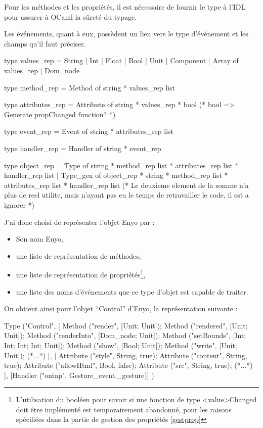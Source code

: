 \documentclass[11pt,a4paper]{report}
\begin{document}
Pour les méthodes et les propriétés, il est nécessaire de fournir le type à l'IDL pour assurer à
OCaml la sûreté du typage.

Les événements, quant à eux, possèdent un lien vers le type d'événement et les champs qu'il faut préciser.

\begin{OCaml}
type values_rep =  String | Int | Float | Bool | Unit 
		   | Component | Array of values_rep | Dom_node

type method_rep = Method of string * values_rep list

type attributes_rep = Attribute of string * values_rep * bool (* bool => Generate propChanged function? *)

type event_rep = Event of string * attributes_rep list

type handler_rep = Handler of string * event_rep

type object_rep = Type of string * method_rep list * attributes_rep list * handler_rep list
		  | Type_gen of object_rep * string * method_rep list * attributes_rep list * handler_rep list
                  (* Le deuxieme element de la somme n'a plus de reel utilite, mais n'ayant pas eu le temps
                  de retravailler le code, il est a ignorer *)
\end{OCaml}

J'ai donc choisi de représenter l'objet Enyo par :
\begin{itemize}
\item Son nom Enyo,
\item une liste de représentation de méthodes,
\item une liste de représentation de propriétés\footnote{L'utilisation du booléen pour savoir si 
une fonction de type <value>Changed doit être implémenté est temporairement abandonné, pour
les raisons spécifiées dans la partie de gestion des propriétés \ref{gestprop}},
\item une liste des noms d'événements que ce type d'objet est capable de traiter.
\end{itemize}

On obtient ainsi pour l'objet ``Control'' d'Enyo, la représentation suivante :

\begin{OCaml}
Type ("Control",
      [
	Method ("render", [Unit; Unit]);
	Method ("rendered", [Unit; Unit]);
	Method ("renderInto", [Dom_node; Unit]);
	Method ("setBounds", [Int; Int; Int; Int; Unit]);
	Method ("show", [Bool; Unit]);
	Method ("write", [Unit; Unit]);
        (*...*)
      ],
      [
	Attribute ("style", String, true);
	Attribute ("content", String, true);
	Attribute ("allowHtml", Bool, false);
	Attribute ("src", String, true);
        (*...*)
      ],
      [Handler ("ontap", Gesture_event._gesture)]
)
\end{OCaml}
\end{document}
